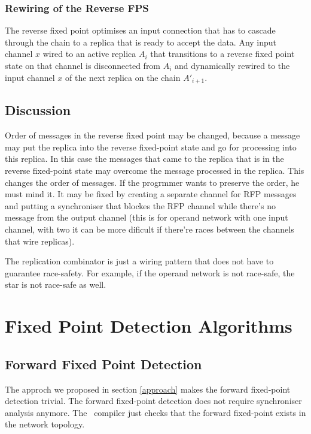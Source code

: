     \subsubsection{Rewiring of the Reverse FPS}
The reverse fixed point optimises an input connection that has to cascade through the chain to a replica that is ready to accept the data. Any input channel $x$ wired to an active replica $A_i$ that transitions to a reverse fixed point state on that channel is disconnected from $A_i$ and dynamically rewired to the input channel $x$ of the next replica on the chain $A'_{i+1}$.



    \subsection{Discussion}
Order of messages in the reverse fixed point may be changed, because a message may put the replica into the reverse fixed-point state and go for processing into this replica. In this case the messages that came to the replica that is in the reverse fixed-point state may overcome the message processed in the replica. This changes the order of messages. If the progrmmer wants to preserve the order, he must mind it. It may be fixed by creating a separate channel for RFP messages and putting a synchroniser that blockes the RFP channel while there's no message from the output channel (this is for operand network with one input channel, with two it can be more dificult if there're races between the channels that wire replicas).

The replication combinator is just a wiring pattern that does not have to guarantee race-safety. For example, if the operand network is not race-safe, the star is not race-safe as well.


\section{Fixed Point Detection Algorithms}

    \subsection{Forward Fixed Point Detection\label{ffp_detect}}
The approch we proposed in section \ref{approach} makes the forward fixed-point detection trivial. The forward fixed-point detection does not require synchroniser analysis anymore. The \ak\ compiler just checks that the forward fixed-point exists in the network topology.

